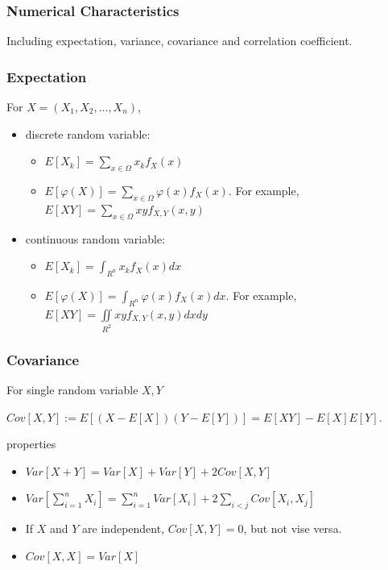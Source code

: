 \documentclass{beamer}
\begin{document}
\begin{frame}
    \frametitle{Numerical Characteristics}
    Including expectation, variance, covariance and correlation coefficient.
    

\end{frame}

\begin{frame}
    \frametitle{Expectation}
    For $X=(X_1,X_2,\dots , X_n)$,\par
    \begin{itemize}
        \item discrete random variable:\par
        \begin{itemize}
            \item $E[X_k]=\sum\limits_{x\in\Omega}x_{k}f_{X}(x)$
            \item $E[\varphi(X)]=\sum\limits_{x\in\Omega}\varphi(x)f_{X}(x)$. For example, $E[XY]=\sum\limits_{x\in\Omega}xyf_{X,Y}(x,y)$
        \end{itemize}
        

        \item continuous random variable:
        \begin{itemize}
            \item $E[X_k]=\int_{R^n} x_k f_{X}(x)dx$
            \item $E[\varphi(X)]=\int_{R^n} \varphi(x) f_{X}(x)dx$. For example, $E[XY]=\iint\limits_{R^2} xy f_{X,Y}(x,y)dxdy$
        \end{itemize}
    \end{itemize}

\end{frame}

\begin{frame}
    \frametitle{Covariance}
    For single random variable $X, Y$\par
    $Cov[X,Y]:=E[(X-E[X])(Y-E[Y])]=E[XY]-E[X]E[Y]$.\par
    properties
    \begin{itemize}
        \item $Var[X+Y]=Var[X]+Var[Y]+2Cov[X,Y]$
        \item $Var[\sum\limits_{i=1}^{n}X_i]=\sum\limits_{i=1}^{n} Var[X_i]+2\sum\limits_{i<j}Cov[X_i,X_j]$
        \item If $X$ and $Y$ are independent, $Cov[X,Y]=0$, but not vise versa.
        \item $Cov[X,X]=Var[X]$
    \end{itemize}

    

\end{frame}
\end{document}

